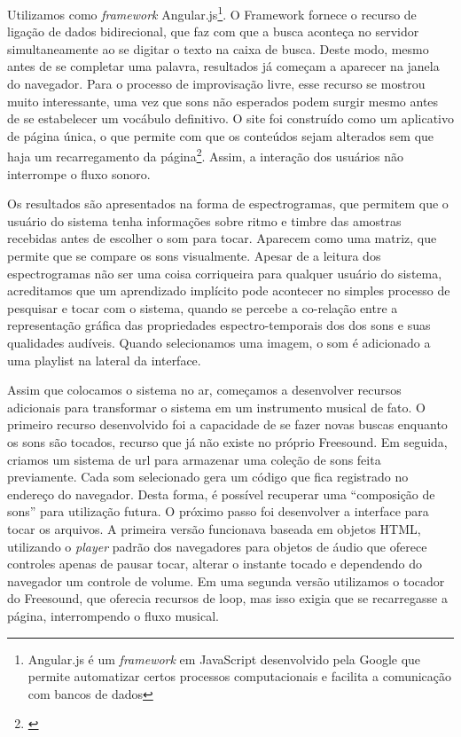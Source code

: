 Utilizamos como \emph{framework} Angular.js\footnote{Angular.js é um \emph{framework} em JavaScript desenvolvido pela Google que permite automatizar certos processos computacionais e facilita a comunicação com bancos de dados}. O Framework fornece o recurso de ligação de dados bidirecional, que faz com que a busca aconteça no servidor simultaneamente ao se digitar o texto na caixa de busca. Deste modo, mesmo antes de se completar uma palavra, resultados já começam a aparecer na janela do navegador. Para o processo de improvisação livre, esse recurso se mostrou muito interessante, uma vez que sons não esperados podem surgir mesmo antes de se estabelecer um vocábulo definitivo. O site foi construído como um aplicativo de página única, o que permite com que os conteúdos sejam alterados sem que haja um recarregamento da página\footnote{\cite{Jadhav}}. Assim, a interação dos usuários não interrompe o fluxo sonoro.

Os resultados são apresentados na forma de espectrogramas, que permitem que o usuário do sistema tenha informações sobre ritmo e timbre das amostras recebidas antes de escolher o som para tocar. Aparecem como uma matriz, que permite que se compare os sons visualmente. Apesar de a leitura dos espectrogramas não ser uma coisa corriqueira para qualquer usuário do sistema, acreditamos que um aprendizado implícito pode acontecer no simples processo de pesquisar e tocar com o sistema, quando se percebe a co-relação entre a representação gráfica das propriedades espectro-temporais dos dos sons e suas qualidades audíveis. Quando selecionamos uma imagem, o som é adicionado a uma playlist na lateral da interface.

 Assim que colocamos o sistema no ar, começamos a desenvolver recursos adicionais para transformar o sistema em um instrumento musical de fato. O primeiro recurso desenvolvido foi a capacidade de se fazer novas buscas enquanto os sons são tocados, recurso que já não existe no próprio Freesound. Em seguida, criamos um sistema de url para armazenar uma coleção de sons feita previamente. Cada som selecionado gera um código que fica registrado no endereço do navegador. Desta forma, é possível recuperar uma ``composição de sons'' para utilização futura. O próximo passo foi desenvolver a interface para tocar os arquivos. A primeira versão funcionava baseada em objetos HTML, utilizando o \emph{player} padrão dos navegadores para objetos de áudio que oferece controles apenas de pausar tocar, alterar o instante tocado e dependendo do navegador um controle de volume. Em uma segunda versão utilizamos o tocador do Freesound, que oferecia recursos de loop, mas isso exigia que se recarregasse a página, interrompendo o fluxo musical. 


